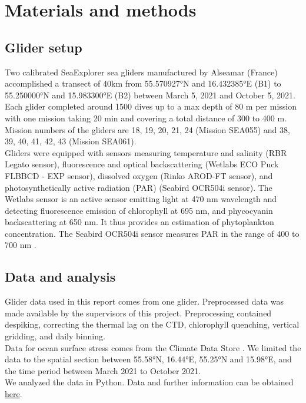 \documentclass[../Main.tex]{subfiles}
\begin{document}
\section{Materials and methods}
\subsection{Glider setup}
Two calibrated SeaExplorer sea gliders manufactured by Alseamar (France) accomplished a transect of 40km from 55.570927°N and 16.432385°E (B1) to 55.250000°N and 15.983300°E (B2) between March 5, 2021 and October 5, 2021. Each glider completed around 1500 dives up to a max depth of 80 m per mission with one mission taking 20 min and covering a total distance of 300 to 400 m. Mission numbers of the gliders are 18, 19, 20, 21, 24 (Mission SEA055) and 38, 39, 40, 41, 42, 43 (Mission SEA061). \\ Gliders were equipped with sensors measuring temperature and salinity (RBR Legato sensor), fluorescence and optical backscattering (Wetlabs ECO Puck FLBBCD - EXP sensor), dissolved oxygen (Rinko AROD-FT sensor), and photosynthetically active radiation (PAR) (Seabird OCR504i sensor). The Wetlabs sensor is an active sensor emitting light at 470 nm wavelength and detecting fluorescence emission of chlorophyll at 695 nm, and phycocyanin backscattering at 650 nm. It thus provides an estimation of phytoplankton concentration. The Seabird OCR504i sensor measures PAR in the range of 400 to 700 nm \cite{x}.

\subsection{Data and analysis}
Glider data used in this report comes from one glider. Preprocessed data was made available by the supervisors of this project. Preprocessing contained despiking, correcting the thermal lag on the CTD, chlorophyll quenching, vertical gridding, and daily binning. \\ Data for ocean surface stress comes from the Climate Data Store \cite{x}. We limited the data to the spatial section between 55.58°N, 16.44°E, 55.25°N and 15.98°E, and the time period between March 2021 to October 2021. \\
We analyzed the data in Python. Data and further information can be obtained \href{https://github.com/joaldi2208/BloomDynamics}{here}.
\end{document}
